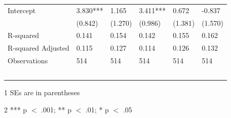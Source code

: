 \documentclass[12pt]{article}
\begin{document}
\begin{table}[!ht]
\begin{tabular}{llllll}
        Intercept & 3.830*** & 1.165 & 3.411*** & 0.672 & -0.837 \\
        ~ & (0.842) & (1.270) & (0.986) & (1.381) & (1.570) \\
        R-squared & 0.141 & 0.154 & 0.142 & 0.155 & 0.162 \\
        R-squared Adjusted & 0.115 & 0.127 & 0.114 & 0.126 & 0.132 \\
        Observations  & 514 & 514 & 514 & 514 & 514 \\
        ~ & ~ & ~ & ~ & ~ & ~ \\
        \midrule
    \end{tabular}
    \begin{tablenotes}
      \item[1] SEs are in parentheses
      \item[2] *** p $<$ .001; ** p $<$ .01; * p $<$ .05
    \end{tablenotes}
  \label{table7}
\end{table}
\end{document}
